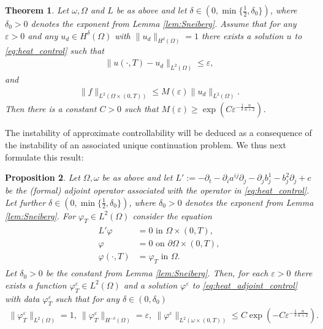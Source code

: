 \documentclass[12pt,twoside]{amsart}
\numberwithin{equation}{section}
\renewcommand{\leq}{\leqslant}
\renewcommand{\geq}{\geqslant}
\newtheorem{theorem}{Theorem}[section]
\newtheorem{proposition}[theorem]{Proposition}
\newcommand {\p} {\partial}
\newcommand{\eps}{\varepsilon}
\begin{document}
\begin{theorem}
\label{thm:controllability_heat_cost}
Let $\omega, \Omega$ and $L$ be as above and let $\delta \in (0, \min\{\frac{1}{2},\delta_0\})$, where $\delta_0>0$ denotes the exponent from Lemma \ref{lem:Sneiberg}. Assume that for any $\eps>0$ and any $u_d \in H^{\delta}(\Omega)$ with $\|u_d\|_{H^{\delta}(\Omega)}=1$ there exists a solution $u$ to \eqref{eq:heat_control} such that
\begin{align*}
\|u(\cdot, T)-u_d\|_{L^2(\Omega)} \leq \eps,
\end{align*}
and
\begin{align*}
\|f\|_{L^2(\Omega\times (0,T))} \leq M(\eps) \|u_d\|_{L^2(\Omega)}.
\end{align*}
Then there is a constant $C>0$ such that $M(\eps)\geq \exp(C \eps^{-\frac{1}{\delta}\frac{n}{n+2}})$.
\end{theorem}



The instability of approximate controllability will be deduced as a consequence of the instability of an associated unique continuation problem. We thus next formulate this result:

\begin{proposition}
\label{prop:UCP_heat_unstable}
Let $\Omega, \omega$ be as above and let $L':= -\p_t - \p_i a^{ij}\p_j - \p_j b_j^1 - b_j^2 \p_j + c$ be the (formal) adjoint operator associated with the operator in \eqref{eq:heat_control}. Let further $\delta \in (0, \min\{\frac{1}{2},\delta_0\})$, where $\delta_0>0$ denotes the exponent from Lemma \ref{lem:Sneiberg}. For $\varphi_T\in L^2(\Omega)$ consider the equation
\begin{align}
\label{eq:heat_adjoint_control}
\begin{split}
L' \varphi &= 0 \mbox{ in } \Omega \times (0,T),\\
 \varphi & = 0 \mbox{ on } \partial \Omega \times (0,T),\\
\varphi(\cdot, T) &= \varphi_T \mbox{ in } \Omega.
\end{split}
\end{align}
Let $\delta_0>0$ be the constant from Lemma \ref{lem:Sneiberg}.
Then, for each $\eps>0$ there exists a function $\varphi_T^{\eps} \in L^2(\Omega)$ and a solution $\varphi^{\eps}$ to \eqref{eq:heat_adjoint_control} with data $\varphi_T^{\eps}$ such that for any $\delta \in (0,\delta_0)$
\begin{align}
\label{eq:UCP_heat}
\|\varphi_T^{\eps}\|_{L^{2}(\Omega)} = 1, \ \|\varphi_T^{\eps}\|_{H^{-\delta}(\Omega)} = \eps, \ \|\varphi^{\eps}\|_{L^2(\omega \times (0,T))} \leq C \exp(-C\eps^{-\frac{1}{\delta} \frac{n}{n+2}}).
\end{align}
\end{proposition}
\end{document}
